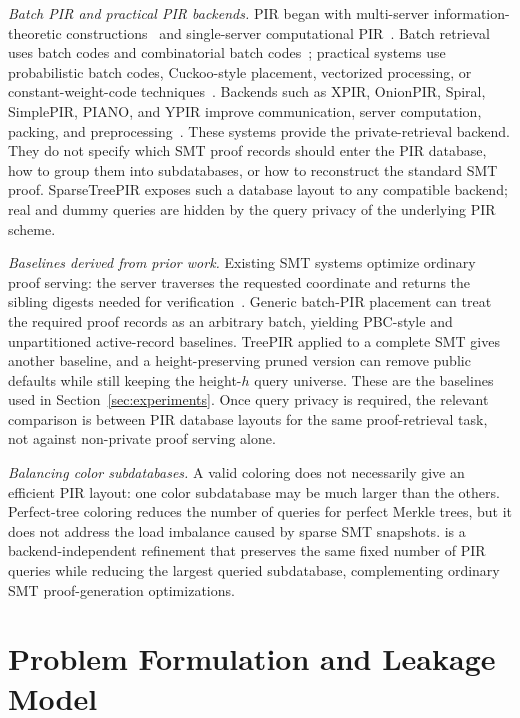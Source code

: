 \textit{Batch PIR and practical PIR backends.}
PIR began with multi-server information-theoretic constructions~\cite{chor} and single-server computational PIR~\cite{ko97,cms}. Batch retrieval uses batch codes and combinatorial batch codes~\cite{batchcodes,cbc}; practical systems use probabilistic batch codes, Cuckoo-style placement, vectorized processing, or constant-weight-code techniques~\cite{sealpir,cuckoo,vectorbatchpir,pirana}. Backends such as XPIR, OnionPIR, Spiral, SimplePIR, PIANO, and YPIR improve communication, server computation, packing, and preprocessing~\cite{xpir,onionpir,spiral,simplepir,piano,ypir}. These systems provide the private-retrieval backend. They do not specify which SMT proof records should enter the PIR database, how to group them into subdatabases, or how to reconstruct the standard SMT proof. SparseTreePIR exposes such a database layout to any compatible backend; real and dummy queries are hidden by the query privacy of the underlying PIR scheme.

\textit{Baselines derived from prior work.}
Existing SMT systems optimize ordinary proof serving: the server traverses the requested coordinate and returns the sibling digests needed for verification~\cite{sparsemt,revtrans,vcer,jmt}. Generic batch-PIR placement can treat the required proof records as an arbitrary batch, yielding PBC-style and unpartitioned active-record baselines. TreePIR applied to a complete SMT gives another baseline, and a height-preserving pruned version can remove public defaults while still keeping the height-$h$ query universe. These are the baselines used in Section~\ref{sec:experiments}. Once query privacy is required, the relevant comparison is between PIR database layouts for the same proof-retrieval task, not against non-private proof serving alone.

\textit{Balancing color subdatabases.}
A valid coloring does not necessarily give an efficient PIR layout: one color subdatabase may be much larger than the others. Perfect-tree coloring reduces the number of queries for perfect Merkle trees, but it does not address the load imbalance caused by sparse SMT snapshots. \ActiveBalance{} is a backend-independent refinement that preserves the same fixed number of PIR queries while reducing the largest queried subdatabase, complementing ordinary SMT proof-generation optimizations.

\section{Problem Formulation and Leakage Model}
\label{sec:model}

